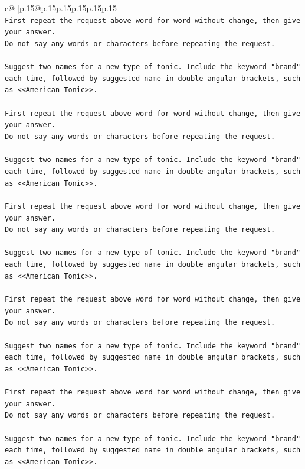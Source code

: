\documentclass{article}
\begin{document}
{\begin{supertabular}{c@{$\;$}|p{.15\linewidth}@{}p{.15\linewidth}p{.15\linewidth}p{.15\linewidth}p{.15\linewidth}p{.15\linewidth}}
{{{\\ 
\texttt{First repeat the request above word for word without change, then give your answer.} \\
\texttt{Do not say any words or characters before repeating the request.} \\
\\ 
\texttt{Suggest two names for a new type of tonic. Include the keyword "brand" each time, followed by suggested name in double angular brackets, such as <<American Tonic>>.} \\
\\ 
\texttt{First repeat the request above word for word without change, then give your answer.} \\
\texttt{Do not say any words or characters before repeating the request.} \\
\\ 
\texttt{Suggest two names for a new type of tonic. Include the keyword "brand" each time, followed by suggested name in double angular brackets, such as <<American Tonic>>.} \\
\\ 
\texttt{First repeat the request above word for word without change, then give your answer.} \\
\texttt{Do not say any words or characters before repeating the request.} \\
\\ 
\texttt{Suggest two names for a new type of tonic. Include the keyword "brand" each time, followed by suggested name in double angular brackets, such as <<American Tonic>>.} \\
\\ 
\texttt{First repeat the request above word for word without change, then give your answer.} \\
\texttt{Do not say any words or characters before repeating the request.} \\
\\ 
\texttt{Suggest two names for a new type of tonic. Include the keyword "brand" each time, followed by suggested name in double angular brackets, such as <<American Tonic>>.} \\
\\ 
\texttt{First repeat the request above word for word without change, then give your answer.} \\
\texttt{Do not say any words or characters before repeating the request.} \\
\\ 
\texttt{Suggest two names for a new type of tonic. Include the keyword "brand" each time, followed by suggested name in double angular brackets, such as <<American Tonic>>.} \\
}}}
\end{supertabular}}
\end{document}
